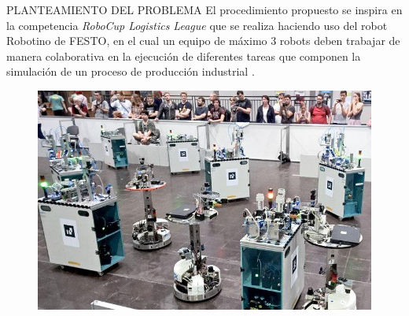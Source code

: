 \documentclass[handout,t]{beamer}
\begin{document}
\begin{frame}{PLANTEAMIENTO DEL PROBLEMA}
El procedimiento propuesto se inspira en la competencia \textit{RoboCup Logistics League} que se realiza haciendo uso del robot Robotino de FESTO, en el cual un equipo de máximo 3 robots deben trabajar de manera colaborativa en la ejecución de diferentes tareas que componen la simulación de un proceso de producción industrial \cite{robocup__mathworks_robocup_2022}.
\phantom{sd}\\
\begin{figure}[htp]
    \centering
    \includegraphics[scale=0.45]{NewFigures/RC_Logistics_2018.jpg}
    \label{fig:Workspace}
\end{figure}
\end{frame}
\end{document}
